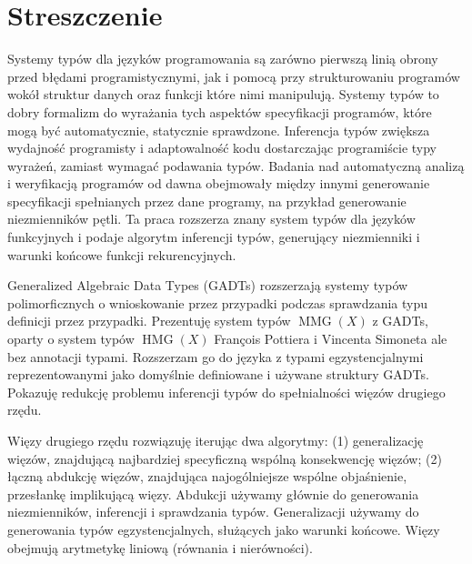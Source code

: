 \documentclass{article}
\newcommand{\tmop}[1]{\ensuremath{\operatorname{#1}}}
\begin{document}
\chapter*{Streszczenie}

Systemy typ{\'o}w dla j{\k e}zyk{\'o}w programowania s{\k a} zar{\'o}wno
pierwsz{\k a} lini{\k a} obrony przed b{\l}{\k e}dami programistycznymi, jak i
pomoc{\k a} przy strukturowaniu program{\'o}w wok{\'o}{\l} struktur danych
oraz funkcji kt{\'o}re nimi manipuluj{\k a}. Systemy typ{\'o}w to dobry
formalizm do wyra{\.z}ania tych aspekt{\'o}w specyfikacji program{\'o}w,
kt{\'o}re mog{\k a} by{\'c} automatycznie, statycznie sprawdzone. Inferencja
typ{\'o}w zwi{\k e}ksza wydajno{\'s}{\'c} programisty i adaptowalno{\'s}{\'c}
kodu dostarczaj{\k a}c programi{\'s}cie typy wyra{\.z}e{\'n}, zamiast
wymaga{\'c} podawania typ{\'o}w. Badania nad automatyczn{\k a} analiz{\k a} i
weryfikacj{\k a} program{\'o}w od dawna obejmowa{\l}y mi{\k e}dzy innymi
generowanie specyfikacji spe{\l}nianych przez dane programy, na przyk{\l}ad
generowanie niezmiennik{\'o}w p{\k e}tli. Ta praca rozszerza znany system
typ{\'o}w dla j{\k e}zyk{\'o}w funkcyjnych i podaje algorytm inferencji
typ{\'o}w, generuj{\k a}cy niezmienniki i warunki ko{\'n}cowe funkcji
rekurencyjnych.

Generalized Algebraic Data Types (GADTs) rozszerzaj{\k a} systemy typ{\'o}w
polimorficznych o wnioskowanie przez przypadki podczas sprawdzania typu
definicji przez przypadki. Prezentuj{\k e} system typ{\'o}w $\tmop{MMG} (X)$ z
GADTs, oparty o system typ{\'o}w $\tmop{HMG} (X)$ Fran{\c c}ois Pottiera i
Vincenta Simoneta ale bez annotacji typami. Rozszerzam go do j{\k e}zyka z
typami egzystencjalnymi reprezentowanymi jako domy{\'s}lnie definiowane i
u{\.z}ywane struktury GADTs. Pokazuj{\k e} redukcj{\k e} problemu inferencji
typ{\'o}w do spe{\l}nialno{\'s}ci wi{\k e}z{\'o}w drugiego rz{\k
e}du.{\hspace*{\fill}}

Wi{\k e}zy drugiego rz{\k e}du rozwi{\k a}zuj{\k e} iteruj{\k a}c dwa
algorytmy: (1) generalizacj{\k e} wi{\k e}z{\'o}w, znajduj{\k a}c{\k a}
najbardziej specyficzn{\k a} wsp{\'o}ln{\k a} konsekwencj{\k e} wi{\k
e}z{\'o}w; (2) {\l}{\k a}czn{\k a} abdukcj{\k e} wi{\k e}z{\'o}w,
zna{\nobreak}jduj{\k a}ca najog{\'o}lniejsze wsp{\'o}lne obja{\'s}nienie,
przes{\l}ank{\k e} implikuj{\k a}c{\k a} wi{\k e}zy. Abdukcji u{\.z}ywamy
g{\l}{\'o}wnie do generowania niezmiennik{\'o}w, inferencji i sprawdzania
typ{\'o}w. Generalizacji u{\.z}ywamy do generowania typ{\'o}w
egzystencjalnych, s{\l}u{\.z}{\k a}cych jako warunki ko{\'n}cowe. Wi{\k e}zy
obejmuj{\k a} arytmetyk{\k e} liniow{\k a} (r{\'o}wnania i
nier{\'o}wno{\'s}ci).
\end{document}
